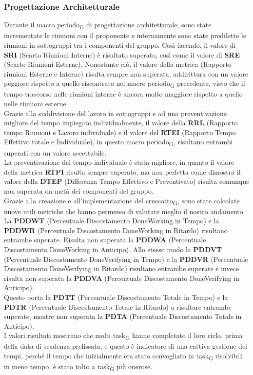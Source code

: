 \subsubsection{Progettazione Architetturale}
Durante il macro periodo\textsubscript{G} di progettazione architetturale, sono state incrementate le riunioni con il proponente e internamente sono state predilette le riunioni in sottogruppi tra i componenti del gruppo. Così facendo,
il valore di \textbf{SRI} (Scarto Riunioni Interne) è risultato superato, così come il valore di \textbf{SRE} (Scarto Riunioni Esterne). Nonostante ciò, il valore della metrica (Rapporto riunioni Esterne e Interne) risulta sempre non superata, addirittura con un valore peggiore rispetto a quello riscontrato nel macro periodo\textsubscript{G} precedente, visto che il tempo trascorso nelle riunioni interne è ancora molto maggiore rispetto a quello nelle riunioni esterne.\\
Grazie alla suddivisione del lavoro in sottogruppi e ad una preventivazione migliore del tempo impiegato individualmente, il valore della \textbf{RRL} (Rapporto tempo Riunioni e Lavoro individuale) e il valore del \textbf{RTEI} (Rapporto Tempo Effettivo totale e Individuale), in questo macro periodo\textsubscript{G}, risultano entrambi superati con un valore accettabile. \\
La preventivazione del tempo individuale è stata migliore, in quanto il valore della metrica \textbf{RTPI} risulta sempre superato, ma non perfetta come dimostra il valore della \textbf{DTEP} (Differenza Tempo Effettivo e Preventivato) risulta comunque non superata da metà dei componenti del gruppo.\\
Grazie alla creazione e all'implementazione del cruscotto\textsubscript{G}, sono state calcolate nuove utili metriche che hanno permesso di valutare meglio il nostro andamento. \\
La \textbf{PDDWT} (Percentuale Discostamento DoneWorking in Tempo) e la \textbf{PDDWR} (Percentuale Discostamento DoneWorking in Ritardo) risultano entrambe superate. Risulta non superata la \textbf{PDDWA} (Percentuale Discostamento DoneWorking in Anticipo). Allo stesso modo la \textbf{PDDVT} (Percentuale Discostamento DoneVerifying in Tempo) e la \textbf{PDDVR} (Percentuale Discostamento DoneVerifying in Ritardo) risultano entrambe superate e invece risulta non superata la \textbf{PDDVA} (Percentuale Discostamento DoneVerifying in Anticipo). \\ Questo porta la \textbf{PDTT} (Percentuale Discostamento Totale in Tempo) e la \textbf{PDTR} (Percentuale Discostamento Totale in Ritardo) a risultare entrambe superate, mentre non superata la \textbf{PDTA} (Percentuale Discostamento Totale in Anticipo).\\ I valori risultati mostrano che molti task\textsubscript{G} hanno completato il loro ciclo, prima della data di scadenza prefissata, e questo è indicatore di una cattiva gestione dei tempi, perché il tempo che inizialmente era stato convogliato in task\textsubscript{G} risolvibili in meno tempo, è stato tolto a task\textsubscript{G} più onerose.\\
